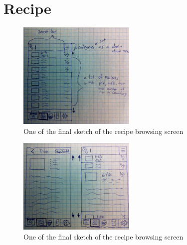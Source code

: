 \section{Recipe}



\begin{figure}[H]
    \centering
    \includegraphics[width=0.5\textwidth]{Grafik/FoodPlanner/FinalRecipeBrowsingSketch1}
    \caption{One of the final sketch of the recipe browsing screen}
    \label{FinalRecipeBrowsingSketch1}
\end{figure}

\begin{figure}[H]
    \centering
    \includegraphics[width=0.5\textwidth]{Grafik/FoodPlanner/FinalRecipeBrowsingSketch2}
    \caption{One of the final sketch of the recipe browsing screen}
    \label{FinalRecipeBrowsingSketch2}
\end{figure}

